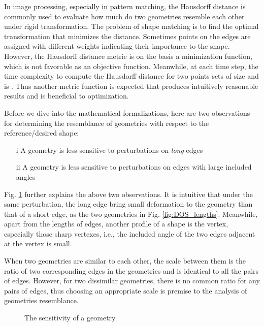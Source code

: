 \documentclass[times]{rncauth}
\begin{document}
In image processing, especially in pattern matching, the Hausdorff distance is commonly used to evaluate how much do two geometries resemble each other under rigid transformation\cite{Hutten93hausdorff}. The problem of shape matching is to find the optimal transformation that minimizes the distance. Sometimes points on the edges are assigned with different weights indicating their importance to the shape. However, the Hausdorff distance metric is on the basis a minimization function, which is  not favorable as an objective function. Meanwhile, at each  time step, the time complexity to compute the Hausdorff distance  for two points sets of size  and  is . Thus another metric function is expected that produces intuitively reasonable results and is beneficial to optimization.

Before we dive into the mathematical formalizations, here are two observations for determining the resemblance of  geometries with respect to the reference/desired shape:
\begin{itemize}
  \item [i] A geometry is less sensitive to perturbations on \emph{long} edges
  \item [ii] A geometry is less sensitive to perturbations on edges with large included angles 
\end{itemize}
Fig. \ref{fig:DOS} further explains the above two observations.
It is intuitive that  under the same perturbation, the long edge bring small deformation to the geometry
than that of a short edge, as the two geometries in Fig. \ref{fig:DOS_lengths}.
Meanwhile, apart from the lengths of edges, another profile of a shape is the vertex,
especially those sharp vertexes, i.e., the included angle of the two  edges adjacent at  the vertex is small.


 When two geometries are similar to each other, the scale between them is the ratio of two corresponding edges in the geometries and is identical to all  the pairs of edges. However, for two dissimilar geometries, there is no common ratio for any pairs of edges, thus choosing an appropriate scale is premise to the analysis of geometries resemblance.

\begin{figure}
\caption{The sensitivity  of a geometry}\label{fig:DOS}
\end{figure}
\end{document}
